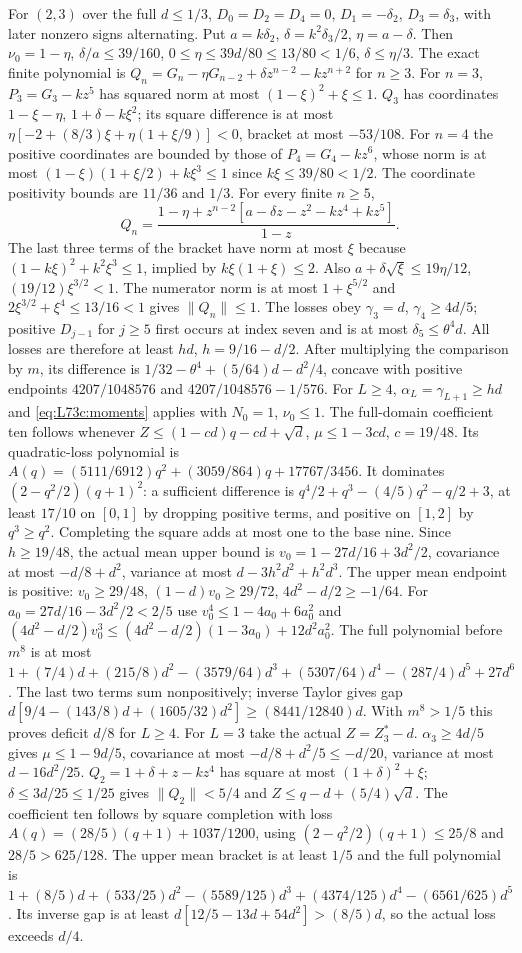 For $(2,3)$ over the full $d\le1/3$, $D_0=D_2=D_4=0$,
$D_1=-\delta_2$, $D_3=\delta_3$, with later nonzero signs
alternating. Put $a=k\delta_2$, $\delta=k^2\delta_3/2$,
$\eta=a-\delta$. Then
$\nu_0=1-\eta$, $\delta/a\le39/160$,
$0\le\eta\le39d/80\le13/80<1/6$, $\delta\le\eta/3$.
The exact finite polynomial is
$Q_n=G_n-\eta G_{n-2}+\delta z^{n-2}-kz^{n+2}$ for $n\ge3$.
For $n=3$, $P_3=G_3-kz^5$ has squared norm at most
$(1-\xi)^2+\xi\le1$.
$Q_3$ has coordinates $1-\xi-\eta$, $1+\delta-k\xi^2$;
its square difference is at most
$\eta[-2+(8/3)\xi+\eta(1+\xi/9)]<0$, bracket at most $-53/108$.
For $n=4$ the positive coordinates are bounded by those of
$P_4=G_4-kz^6$, whose norm is at most
$(1-\xi)(1+\xi/2)+k\xi^3\le1$ since $k\xi\le39/80<1/2$.
The coordinate positivity bounds are $11/36$ and $1/3$.
For every finite $n\ge5$,
\[
Q_n=\frac{1-\eta+z^{n-2}[a-\delta z-z^2-kz^4+kz^5]}{1-z}.
\]
The last three terms of the bracket have norm at most $\xi$ because
$(1-k\xi)^2+k^2\xi^3\le1$, implied by $k\xi(1+\xi)\le2$.
Also $a+\delta\sqrt\xi\le19\eta/12$,
$(19/12)\xi^{3/2}<1$.
The numerator norm is at most $1+\xi^{5/2}$ and
$2\xi^{3/2}+\xi^4\le13/16<1$ gives $\|Q_n\|\le1$.
The losses obey $\gamma_3=d$, $\gamma_4\ge4d/5$;
positive $D_{j-1}$ for $j\ge5$ first occurs at index seven and is at
most $\delta_5\le\theta^4d$.
All losses are therefore at least $hd$, $h=9/16-d/2$.
After multiplying the comparison by $m$, its difference is
$1/32-\theta^4+(5/64)d-d^2/4$, concave with positive endpoints
$4207/1048576$ and $4207/1048576-1/576$.
For $L\ge4$, $\alpha_L=\gamma_{L+1}\ge hd$ and
\eqref{eq:L73c:moments} applies with $N_0=1$, $\nu_0\le1$.
The full-domain coefficient ten follows whenever
$Z\le(1-cd)q-cd+\sqrt d$, $\mu\le1-3cd$, $c=19/48$.
Its quadratic-loss polynomial is
$A(q)=(5111/6912)q^2+(3059/864)q+17767/3456$.
It dominates $(2-q^2/2)(q+1)^2$: a sufficient difference is
$q^4/2+q^3-(4/5)q^2-q/2+3$, at least $17/10$ on $[0,1]$
by dropping positive terms, and positive on $[1,2]$ by $q^3\ge q^2$.
Completing the square adds at most one to the base nine.
Since $h\ge19/48$, the actual mean upper bound is
$v_0=1-27d/16+3d^2/2$, covariance at most $-d/8+d^2$,
variance at most $d-3h^2d^2+h^2d^3$.
The upper mean endpoint is positive:
$v_0\ge29/48$, $(1-d)v_0\ge29/72$, $4d^2-d/2\ge-1/64$.
For $a_0=27d/16-3d^2/2<2/5$ use
$v_0^4\le1-4a_0+6a_0^2$ and
$(4d^2-d/2)v_0^3\le(4d^2-d/2)(1-3a_0)+12d^2a_0^2$.
The full polynomial before $m^8$ is at most
$1+(7/4)d+(215/8)d^2-(3579/64)d^3+(5307/64)d^4
-(287/4)d^5+27d^6$.
The last two terms sum nonpositively; inverse Taylor gives gap
$d[9/4-(143/8)d+(1605/32)d^2]\ge(8441/12840)d$.
With $m^8>1/5$ this proves deficit $d/8$ for $L\ge4$.
For $L=3$ take the actual $Z=Z_3^*-d$.
$\alpha_3\ge4d/5$ gives $\mu\le1-9d/5$, covariance at most
$-d/8+d^2/5\le-d/20$, variance at most $d-16d^2/25$.
$Q_2=1+\delta+z-kz^4$ has square at most $(1+\delta)^2+\xi$;
$\delta\le3d/25\le1/25$ gives $\|Q_2\|<5/4$ and
$Z\le q-d+(5/4)\sqrt d$.
The coefficient ten follows by square completion with loss
$A(q)=(28/5)(q+1)+1037/1200$,
using $(2-q^2/2)(q+1)\le25/8$ and $28/5>625/128$.
The upper mean bracket is at least $1/5$ and the full polynomial is
$1+(8/5)d+(533/25)d^2-(5589/125)d^3+(4374/125)d^4-(6561/625)d^5$.
Its inverse gap is at least $d[12/5-13d+54d^2]>(8/5)d$,
so the actual loss exceeds $d/4$.

